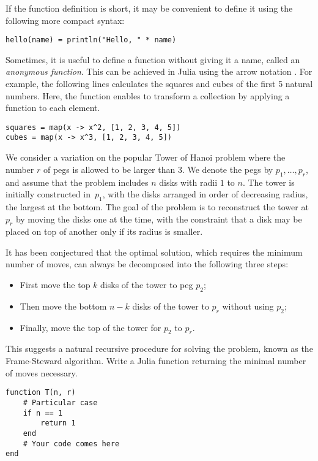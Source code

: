 If the function definition is short,
it may be convenient to define it using the following more compact syntax:
\begin{verbatim}
hello(name) = println("Hello, " * name)
\end{verbatim}

Sometimes, it is useful to define a function without giving it a name, called an \emph{anonymous function}.
This can be achieved in Julia using the arrow notation \julia{->}.
For example, the following lines calculates the squares and cubes of the first 5 natural numbers.
Here, the function  enables to transform a collection by applying a function to each element.
\begin{verbatim}
squares = map(x -> x^2, [1, 2, 3, 4, 5])
cubes = map(x -> x^3, [1, 2, 3, 4, 5])
\end{verbatim}

\begin{task}
    We consider a variation on the popular Tower of Hanoi problem
    where the number $r$ of pegs is allowed to be larger than 3.
    We denote the pegs by $p_1, \dots, p_r$,
    and assume that the problem includes $n$ disks with radii $1$ to $n$.
    The tower is initially constructed in~$p_1$,
    with the disks arranged in order of decreasing radius, the largest at the bottom.
    The goal of the problem is to reconstruct the tower at $p_r$ by moving the disks one at the time,
    with the constraint that a disk may be placed on top of another only if its radius is smaller.

    It has been conjectured that the optimal solution,
    which requires the minimum number of moves,
    can always be decomposed into the following three steps:
    \begin{itemize}
        \item First move the top $k$ disks of the tower to peg $p_2$;
        \item Then move the bottom $n-k$ disks of the tower to $p_r$ without using $p_2$;
        \item Finally, move the top of the tower for $p_2$ to $p_r$.
    \end{itemize}
    This suggests a natural recursive procedure for solving the problem, known as the Frame-Steward algorithm.
    Write a Julia function  returning the minimal number of moves necessary.
\begin{verbatim}
function T(n, r)
    # Particular case
    if n == 1
        return 1
    end
    # Your code comes here
end
\end{verbatim}

\end{task}

